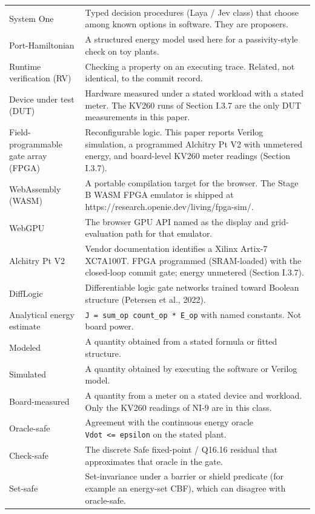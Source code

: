 \documentclass[
  10pt,
]{article}
\begin{document}
{\begin{longtable}[]{@{}
  >{\raggedright\arraybackslash}p{}
  >{\raggedright\arraybackslash}p{}@{}}
System One & Typed decision procedures (Laya / Jev class) that choose
among known options in software. They are proposers. \\
Port-Hamiltonian & A structured energy model used here for a
passivity-style check on toy plants. \\
Runtime verification (RV) & Checking a property on an executing trace.
Related, not identical, to the commit record. \\
Device under test (DUT) & Hardware measured under a stated workload with
a stated meter. The KV260 runs of Section I.3.7 are the only DUT
measurements in this paper. \\
Field-programmable gate array (FPGA) & Reconfigurable logic. This paper
reports Verilog simulation, a programmed Alchitry Pt V2 with unmetered
energy, and board-level KV260 meter readings (Section I.3.7). \\
WebAssembly (WASM) & A portable compilation target for the browser. The
Stage B WASM FPGA emulator is shipped at
https://research.openie.dev/living/fpga-sim/. \\
WebGPU & The browser GPU API named as the display and grid-evaluation
path for that emulator. \\
Alchitry Pt V2 & Vendor documentation identifies a Xilinx Artix-7
XC7A100T. FPGA programmed (SRAM-loaded) with the closed-loop commit
gate; energy unmetered (Section I.3.7). \\
DiffLogic & Differentiable logic gate networks trained toward Boolean
structure (Petersen et al., 2022). \\
Analytical energy estimate & \texttt{J\ =\ sum\_op\ count\_op\ *\ E\_op}
with named constants. Not board power. \\
Modeled & A quantity obtained from a stated formula or fitted
structure. \\
Simulated & A quantity obtained by executing the software or Verilog
model. \\
Board-measured & A quantity from a meter on a stated device and
workload. Only the KV260 readings of NI-9 are in this class. \\
Oracle-safe & Agreement with the continuous energy oracle
\texttt{Vdot\ \textless{}=\ epsilon} on the stated plant. \\
Check-safe & The discrete Safe fixed-point / Q16.16 residual that
approximates that oracle in the gate. \\
Set-safe & Set-invariance under a barrier or shield predicate (for
example an energy-set CBF), which can disagree with oracle-safe. \\
\end{longtable}
}
\end{document}
